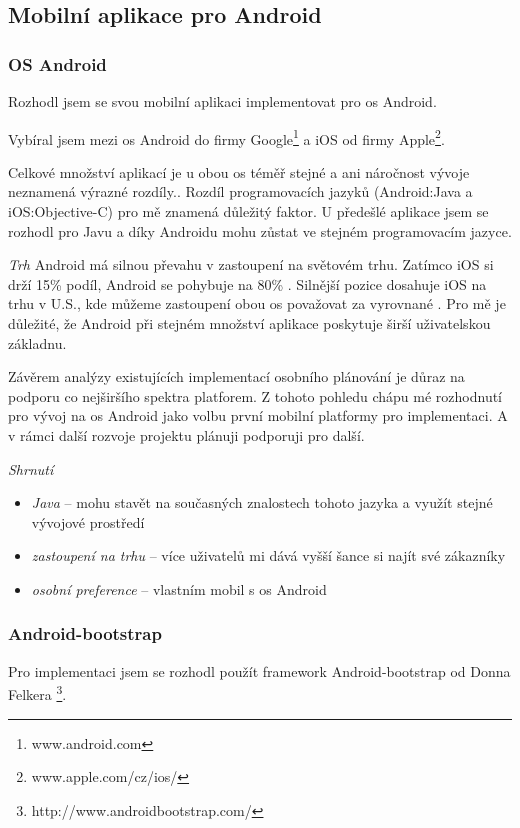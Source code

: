 \documentclass[thesis=B,czech]{FITthesis}[2012/06/26]
\begin{document}
\subsection{Mobilní aplikace pro Android}

\subsubsection {OS Android}

Rozhodl jsem se svou mobilní aplikaci implementovat pro \acrshort{os} Android.

Vybíral jsem mezi \acrshort{os} Android do firmy Google\footnote{www.android.com} a iOS od firmy Apple\footnote{www.apple.com/cz/ios/}.
 
Celkové množství aplikací je u obou \acrshort{os} téměř stejné a ani náročnost vývoje neznamená výrazné rozdíly.\cite{android_what_choose}. Rozdíl programovacích jazyků (Android:Java a iOS:Objective-C) pro mě znamená důležitý faktor. U předešlé aplikace jsem se rozhodl pro Javu a díky Androidu mohu zůstat ve stejném programovacím jazyce.

\textit{Trh}
Android má silnou převahu v zastoupení na světovém trhu. Zatímco iOS si drží 15\% podíl, Android se pohybuje na 80\% \cite{android_market}. Silnější pozice dosahuje iOS na trhu v U.S., kde můžeme zastoupení obou \acrshort{os} považovat za vyrovnané \cite{android_market_us}. 
Pro mě je důležité, že Android při stejném množství aplikace poskytuje širší uživatelskou základnu. 

Závěrem analýzy existujících implementací osobního plánování je důraz na podporu co nejširšího spektra platforem. Z tohoto pohledu chápu mé rozhodnutí pro vývoj na \acrshort{os} Android jako volbu první mobilní platformy pro implementaci. A v rámci další rozvoje projektu plánuji podporuji pro další.\newline

\textit{Shrnutí}
\begin{itemize}[nosep]
	\item \textit{Java} -- mohu stavět na současných znalostech tohoto jazyka a využít stejné vývojové prostředí
	\item \textit{zastoupení na trhu} -- více uživatelů mi dává vyšší šance si najít své zákazníky
	\item \textit{osobní preference} -- vlastním mobil s \acrshort{os} Android
\end{itemize}

\subsubsection{Android-bootstrap}
\label{technologie:androdi:boostrap}
Pro implementaci jsem se rozhodl použít framework Android-bootstrap od Donna Felkera \footnote{http://www.androidbootstrap.com/}.
\end{document}
